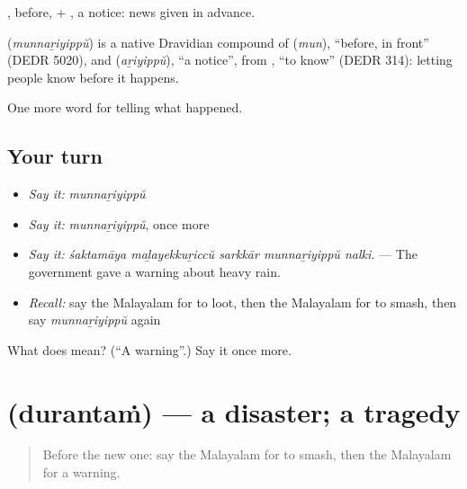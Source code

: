 , before, + , a notice: news given in advance.

\begin{cousinweb}
\textbf{} (\emph{munnaṟiyippŭ}) is a native Dravidian compound of  (\emph{mun}), \textquotedblleft{}before, in front\textquotedblright{} (DEDR 5020), and  (\emph{aṟiyippŭ}), \textquotedblleft{}a notice\textquotedblright{}, from , \textquotedblleft{}to know\textquotedblright{} (DEDR 314): letting people know before it happens.
\end{cousinweb}

\begin{grammarlens}[title={What you've built}]
One more word for telling what happened.
\end{grammarlens}

\subsection*{Your turn}
\begin{itemize}
\raggedright
  \item \emph{Say it:} \emph{munnaṟiyippŭ}
  \item \emph{Say it:} \emph{munnaṟiyippŭ}, once more
  \item \emph{Say it:} \emph{śaktamāya maḻayekkuṟiccŭ sarkkār munnaṟiyippŭ nalki.} — The government gave a warning about heavy rain.
  \item \emph{Recall:} say the Malayalam for to loot, then the Malayalam for to smash, then say \emph{munnaṟiyippŭ} again
\end{itemize}

\begin{tcolorbox}[breakable,colback=teal!4,colframe=teal!35!black,title={Before you move on}]
What does  mean? (\textquotedblleft{}A warning\textquotedblright{}.) Say it once more.
\end{tcolorbox}
\section[\texorpdfstring{\ml{ദുരന്തം} (durantaṁ)}{ദുരന്തം (durantaṁ)}]{ (durantaṁ) — a disaster; a tragedy}

\label{lesson:ML-C374-durantam}



\begin{quote}
Before the new one: say the Malayalam for to smash, then the Malayalam for a warning.
\end{quote}

